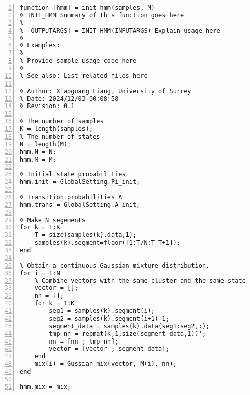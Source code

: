 \documentclass{article}
\begin{document}
\begin{lstlisting}[frame=single, numbers=left, style=Matlab-editor, caption={init\_hmm.m}, label={lst:init_hmm}]
  function [hmm] = init_hmm(samples, M)
% INIT_HMM Summary of this function goes here
%
% [OUTPUTARGS] = INIT_HMM(INPUTARGS) Explain usage here
%
% Examples:
%
% Provide sample usage code here
%
% See also: List related files here

% Author: Xiaoguang Liang, University of Surrey
% Date: 2024/12/03 00:08:58
% Revision: 0.1

% The number of samples
K = length(samples);
% The number of states
N = length(M);
hmm.N = N;
hmm.M = M;

% Initial state probabilities
hmm.init = GlobalSetting.Pi_init;

% Transition probabilities A
hmm.trans = GlobalSetting.A_init;

% Make N segements
for k = 1:K
    T = size(samples(k).data,1);
    samples(k).segment=floor([1:T/N:T T+1]);
end

% Obtain a continuous Gaussian mixture distribution.
for i = 1:N
    % Combine vectors with the same cluster and the same state into a single vector.
    vector = [];
    nn = [];
    for k = 1:K
        seg1 = samples(k).segment(i);
        seg2 = samples(k).segment(i+1)-1;
        segment_data = samples(k).data(seg1:seg2,:);
        tmp_nn = repmat(k,1,size(segment_data,1))';
        nn = [nn ; tmp_nn];
        vector = [vector ; segment_data];
    end
    mix(i) = Gussian_mix(vector, M(i), nn);
end

hmm.mix = mix;

\end{lstlisting}
\end{document}
